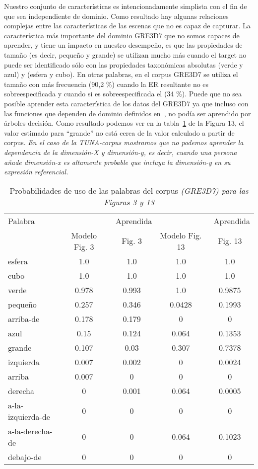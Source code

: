 Nuestro conjunto de caracter\'{i}sticas es intencionadamente simplista con el fin de que sea
independiente de dominio. Como resultado hay algunas relaciones complejas
entre las caracter\'{i}sticas de las escenas que no es capaz de
capturar. La caracter\'{i}stica m\'as importante del dominio GRE3D7
que no somos capaces de aprender, y tiene un impacto en nuestro desempe\~no, es que
las propiedades de tama\~no (es decir, peque\~no y grande) se utilizan mucho
m\'as cuando el target no puede ser identificado s\'olo con las propiedades taxon\'omicas absolutas 
(verde y azul) y (esfera y cubo). En otras palabras, en el corpus GRE3D7 se utiliza el tama\~no con m\'as frecuencia (90,2 \%)
cuando la ER resultante no es sobreespecificada y cuando si es sobreespecificada el (34 \%). 
Puede que no sea posible aprender esta caracter\'{i}stica de los
datos del GRE3D7 ya que incluso con las funciones que dependen de dominio definidos
en~\cite[Cap\'{i}tulo 6] {viet:gene11}, no pod\'{i}a ser aprendido por \'arboles decisi\'on. 
Como resultado podemos ver en la tabla~\ref{probability-of-use} de la Figura 13, el valor estimado para 
``grande'' no est\'a cerca de la
valor calculado a partir de corpus. \textit{En el caso de la TUNA-corpus
  mostramos que no podemos aprender la dependencia de la dimensi\'on-X y
  dimensi\'on-y, es decir, cuando una persona a\~nade dimensi\'on-x es altamente
  probable que incluya la dimensi\'on-y en su expresi\'on referencial.}

\begin{table}[h!]
\begin{center}
\begin{tabular}{|l|c|c|c|c|}
\hline
Palabra &  \puse 					& \puse\ Aprendida & \puse\    							& \puse\  Aprendida \\
        & Modelo Fig. 3   & Fig. 3   				& Modelo Fig. 13  			&  Fig. 13  \\
\hline
esfera & 1.0 & 1.0 & 1.0 & 1.0 \\
cubo & 1.0 & 1.0 & 1.0 & 1.0 \\
verde & 0.978 & 0.993 & 1.0 & 0.9875 \\
peque\~no & 0.257 & 0.346 & 0.0428 & 0.1993 \\
arriba-de & 0.178 & 0.179 & 0 & 0\\ 
azul & 0.15 & 0.124 & 0.064 & 0.1353 \\
grande & 0.107 & 0.03 & 0.307 & 0.7378 \\
izquierda & 0.007 & 0.002 & 0 & 0.0024 \\
arriba & 0.007 & 0 & 0 & 0 \\
derecha & 0 & 0.001 & 0.064 & 0.0005 \\
a-la-izquierda-de & 0 & 0 & 0 & 0 \\
a-la-derecha-de & 0 & 0 & 0.064 & 0.1023 \\
debajo-de & 0 & 0 & 0 & 0 \\
\hline
\end{tabular}
\caption{Probabilidades de uso de las palabras del corpus \textit{(GRE3D7) para las Figuras 3 y 13 } 
\label{probability-of-use}}
\end{center}
\end{table}

